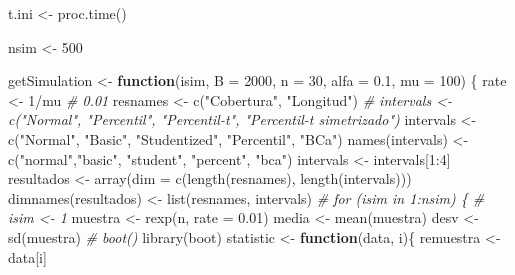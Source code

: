 \documentclass[
]{book}
\newenvironment{Shaded}{\begin{snugshade}}{\end{snugshade}}
\newcommand{\AttributeTok}[1]{\textcolor[rgb]{0.77,0.63,0.00}{#1}}
\newcommand{\CommentTok}[1]{\textcolor[rgb]{0.56,0.35,0.01}{\textit{#1}}}
\newcommand{\ControlFlowTok}[1]{\textcolor[rgb]{0.13,0.29,0.53}{\textbf{#1}}}
\newcommand{\DecValTok}[1]{\textcolor[rgb]{0.00,0.00,0.81}{#1}}
\newcommand{\FloatTok}[1]{\textcolor[rgb]{0.00,0.00,0.81}{#1}}
\newcommand{\FunctionTok}[1]{\textcolor[rgb]{0.00,0.00,0.00}{#1}}
\newcommand{\NormalTok}[1]{#1}
\newcommand{\OtherTok}[1]{\textcolor[rgb]{0.56,0.35,0.01}{#1}}
\newcommand{\SpecialCharTok}[1]{\textcolor[rgb]{0.00,0.00,0.00}{#1}}
\newcommand{\StringTok}[1]{\textcolor[rgb]{0.31,0.60,0.02}{#1}}
\theoremstyle{break}
\theoremstyle{definition}
\theoremstyle{definition}
\theoremstyle{definition}
\theoremstyle{definition}
\theoremstyle{remark}
\begin{document}
\begin{Shaded}
\begin{Highlighting}[]
\NormalTok{t.ini }\OtherTok{\textless{}{-}} \FunctionTok{proc.time}\NormalTok{()}

\NormalTok{nsim }\OtherTok{\textless{}{-}} \DecValTok{500}

\NormalTok{getSimulation }\OtherTok{\textless{}{-}} \ControlFlowTok{function}\NormalTok{(isim, }\AttributeTok{B =} \DecValTok{2000}\NormalTok{, }\AttributeTok{n =} \DecValTok{30}\NormalTok{, }\AttributeTok{alfa =} \FloatTok{0.1}\NormalTok{, }\AttributeTok{mu =} \DecValTok{100}\NormalTok{) \{}
\NormalTok{    rate }\OtherTok{\textless{}{-}} \DecValTok{1}\SpecialCharTok{/}\NormalTok{mu }\CommentTok{\# 0.01}
\NormalTok{    resnames }\OtherTok{\textless{}{-}} \FunctionTok{c}\NormalTok{(}\StringTok{"Cobertura"}\NormalTok{, }\StringTok{"Longitud"}\NormalTok{)}
    \CommentTok{\# intervals \textless{}{-} c("Normal", "Percentil", "Percentil{-}t", "Percentil{-}t simetrizado")}
\NormalTok{    intervals }\OtherTok{\textless{}{-}} \FunctionTok{c}\NormalTok{(}\StringTok{"Normal"}\NormalTok{, }\StringTok{"Basic"}\NormalTok{, }\StringTok{"Studentized"}\NormalTok{, }\StringTok{"Percentil"}\NormalTok{, }\StringTok{"BCa"}\NormalTok{)}
    \FunctionTok{names}\NormalTok{(intervals) }\OtherTok{\textless{}{-}} \FunctionTok{c}\NormalTok{(}\StringTok{"normal"}\NormalTok{,}\StringTok{"basic"}\NormalTok{, }\StringTok{"student"}\NormalTok{, }\StringTok{"percent"}\NormalTok{, }\StringTok{"bca"}\NormalTok{)}
\NormalTok{    intervals }\OtherTok{\textless{}{-}}\NormalTok{ intervals[}\DecValTok{1}\SpecialCharTok{:}\DecValTok{4}\NormalTok{]}
\NormalTok{    resultados }\OtherTok{\textless{}{-}} \FunctionTok{array}\NormalTok{(}\AttributeTok{dim =} \FunctionTok{c}\NormalTok{(}\FunctionTok{length}\NormalTok{(resnames), }\FunctionTok{length}\NormalTok{(intervals)))}
    \FunctionTok{dimnames}\NormalTok{(resultados) }\OtherTok{\textless{}{-}} \FunctionTok{list}\NormalTok{(resnames, intervals)}
    \CommentTok{\# for (isim in 1:nsim) \{ \# isim \textless{}{-} 1}
\NormalTok{    muestra }\OtherTok{\textless{}{-}} \FunctionTok{rexp}\NormalTok{(n, }\AttributeTok{rate =} \FloatTok{0.01}\NormalTok{)}
\NormalTok{    media }\OtherTok{\textless{}{-}} \FunctionTok{mean}\NormalTok{(muestra)}
\NormalTok{    desv }\OtherTok{\textless{}{-}} \FunctionTok{sd}\NormalTok{(muestra)}
    \CommentTok{\# boot()}
    \FunctionTok{library}\NormalTok{(boot)}
\NormalTok{    statistic }\OtherTok{\textless{}{-}} \ControlFlowTok{function}\NormalTok{(data, i)\{}
\NormalTok{      remuestra }\OtherTok{\textless{}{-}}\NormalTok{ data[i]}

\end{Highlighting}
\end{Shaded}
\end{document}
